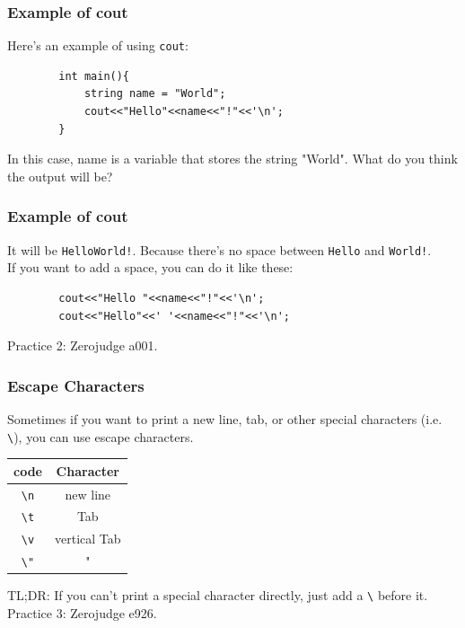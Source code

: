 \documentclass[xcolor=dvipsnames]{beamer}
\begin{document}
    \begin{frame}[fragile]
        \frametitle{Example of cout}
        Here's an example of using \texttt{cout}:
        \begin{verbatim}
        int main(){
            string name = "World";
            cout<<"Hello"<<name<<"!"<<'\n';
        }
        \end{verbatim}
        In this case, name is a variable that stores the string "World". What do you think the output will be?
    \end{frame}

    \begin{frame}[fragile]
        \frametitle{Example of cout}
        It will be \texttt{HelloWorld!}. Because there's no space between \texttt{Hello} and \texttt{World!}.\\
        If you want to add a space, you can do it like these:
        \begin{verbatim}
        cout<<"Hello "<<name<<"!"<<'\n';
        cout<<"Hello"<<' '<<name<<"!"<<'\n';
        \end{verbatim}
        Practice 2: Zerojudge a001.
    \end{frame}

    \begin{frame}
        \frametitle{Escape Characters}
        Sometimes if you want to print a new line, tab, or other special characters (i.e. \texttt{\textbackslash}), you can use escape characters.\\

        \begin{table}[H]
        \begin{tabular}{cc}
        \toprule
        code & Character \\
        \midrule
        \texttt{\textbackslash n} & new line \\
        \texttt{\textbackslash t} & Tab \\
        \texttt{\textbackslash v} & vertical Tab \\
        \texttt{\textbackslash "} & " \\
        \bottomrule
        \end{tabular}
        \end{table}
        TL;DR: If you can't print a special character directly, just add a \texttt{\textbackslash} before it.\\
        Practice 3: Zerojudge e926.
    \end{frame}
\end{document}

